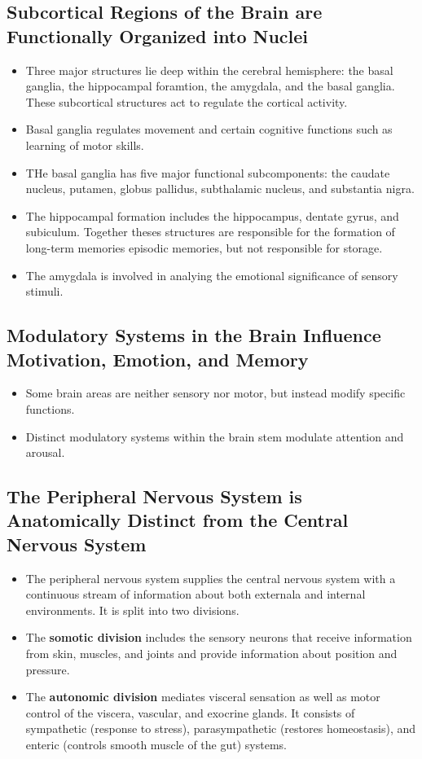 \documentclass[12pt,a4paper]{article}
\begin{document}
\subsection{Subcortical Regions of the Brain are Functionally Organized into Nuclei}
\begin{itemize}
    \item Three major structures lie deep within the cerebral hemisphere: the basal ganglia, the hippocampal foramtion, the amygdala, and the basal ganglia. These subcortical structures act to regulate the cortical activity. 
    \item Basal ganglia regulates movement and certain cognitive functions such as learning of motor skills.
    \item THe basal ganglia has five major functional subcomponents: the caudate nucleus, putamen, globus pallidus, subthalamic nucleus, and substantia nigra.
    \item The hippocampal formation includes the hippocampus, dentate gyrus, and subiculum. Together theses structures are responsible for the formation of long-term memories episodic memories, but not responsible for storage.
    \item The amygdala is involved in analying the emotional significance of sensory stimuli.
\end{itemize}

\subsection{Modulatory Systems in the Brain Influence Motivation, Emotion, and Memory}
\begin{itemize}
    \item Some brain areas are neither sensory nor motor, but instead modify specific functions.
    \item Distinct modulatory systems within the brain stem modulate attention and arousal. 
\end{itemize}

\subsection{The Peripheral Nervous System is Anatomically Distinct from the Central Nervous System}
\begin{itemize}
    \item The peripheral nervous system supplies the central nervous system with a continuous stream of information about both externala and internal environments. It is split into two divisions.
    \item The \textbf{somotic division} includes the sensory neurons that receive information from skin, muscles, and joints and provide information about position and pressure. 
    \item The \textbf{autonomic division} mediates visceral sensation as well as motor control of the viscera, vascular, and exocrine glands. It consists of sympathetic (response to stress), parasympathetic (restores homeostasis), and enteric (controls smooth muscle of the gut) systems.
\end{itemize}
\end{document}
